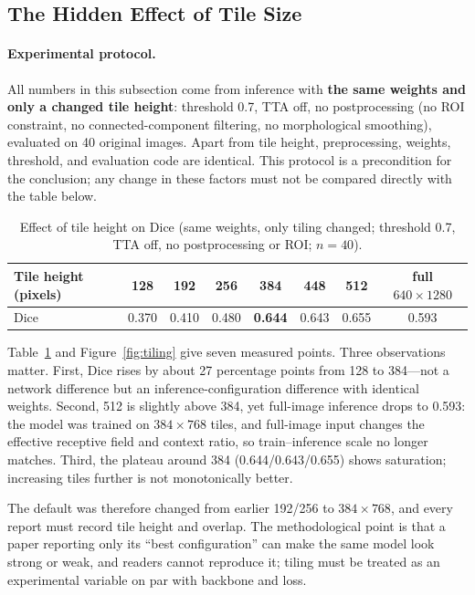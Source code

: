 \subsection{The Hidden Effect of Tile Size}\label{sec:tiling}

\paragraph{Experimental protocol.} All numbers in this subsection come from inference with \textbf{the same weights and only a changed tile height}: threshold 0.7, TTA off, no postprocessing (no ROI constraint, no connected-component filtering, no morphological smoothing), evaluated on 40 original images. Apart from tile height, preprocessing, weights, threshold, and evaluation code are identical. This protocol is a precondition for the conclusion; any change in these factors must not be compared directly with the table below.

\begin{table}[t]
\centering
\caption{Effect of tile height on Dice (same weights, only tiling changed; threshold 0.7, TTA off, no postprocessing or ROI; $n=40$).}
\label{tab:tiling}
\begin{tabular}{lccccccc}
\toprule
Tile height (pixels) & 128 & 192 & 256 & 384 & 448 & 512 & full $640\times1280$ \\
\midrule
Dice & 0.370 & 0.410 & 0.480 & \textbf{0.644} & 0.643 & 0.655 & 0.593 \\
\bottomrule
\end{tabular}
\end{table}

Table~\ref{tab:tiling} and Figure~\ref{fig:tiling} give seven measured points. Three observations matter. First, Dice rises by about 27 percentage points from 128 to 384---not a network difference but an inference-configuration difference with identical weights. Second, 512 is slightly above 384, yet full-image inference drops to 0.593: the model was trained on $384\times768$ tiles, and full-image input changes the effective receptive field and context ratio, so train--inference scale no longer matches. Third, the plateau around 384 (0.644/0.643/0.655) shows saturation; increasing tiles further is not monotonically better.



The default was therefore changed from earlier 192/256 to $384\times768$, and every report must record tile height and overlap. The methodological point is that a paper reporting only its ``best configuration'' can make the same model look strong or weak, and readers cannot reproduce it; tiling must be treated as an experimental variable on par with backbone and loss.

